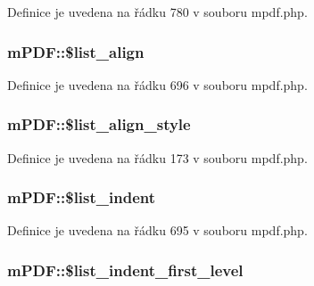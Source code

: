 Definice je uvedena na řádku 780 v souboru mpdf.\-php.

\hypertarget{classm_p_d_f_a3a5c4d84763f3b80b19b554ce20c71c5}{
\subsubsection[{\$list\-\_\-align}]{\setlength{\rightskip}{0pt plus 5cm}m\-P\-D\-F\-::\$list\-\_\-align}}\label{classm_p_d_f_a3a5c4d84763f3b80b19b554ce20c71c5}


Definice je uvedena na řádku 696 v souboru mpdf.\-php.

\hypertarget{classm_p_d_f_a5382dd58dbc66ffe769ce3604997050c}{
\subsubsection[{\$list\-\_\-align\-\_\-style}]{\setlength{\rightskip}{0pt plus 5cm}m\-P\-D\-F\-::\$list\-\_\-align\-\_\-style}}\label{classm_p_d_f_a5382dd58dbc66ffe769ce3604997050c}


Definice je uvedena na řádku 173 v souboru mpdf.\-php.

\hypertarget{classm_p_d_f_ab22d2de37786798d99bd84c6ee7f9c03}{
\subsubsection[{\$list\-\_\-indent}]{\setlength{\rightskip}{0pt plus 5cm}m\-P\-D\-F\-::\$list\-\_\-indent}}\label{classm_p_d_f_ab22d2de37786798d99bd84c6ee7f9c03}


Definice je uvedena na řádku 695 v souboru mpdf.\-php.

\hypertarget{classm_p_d_f_a4573d20171953e9686ea3e7d961594ab}{
\subsubsection[{\$list\-\_\-indent\-\_\-first\-\_\-level}]{\setlength{\rightskip}{0pt plus 5cm}m\-P\-D\-F\-::\$list\-\_\-indent\-\_\-first\-\_\-level}}\label{classm_p_d_f_a4573d20171953e9686ea3e7d961594ab}


